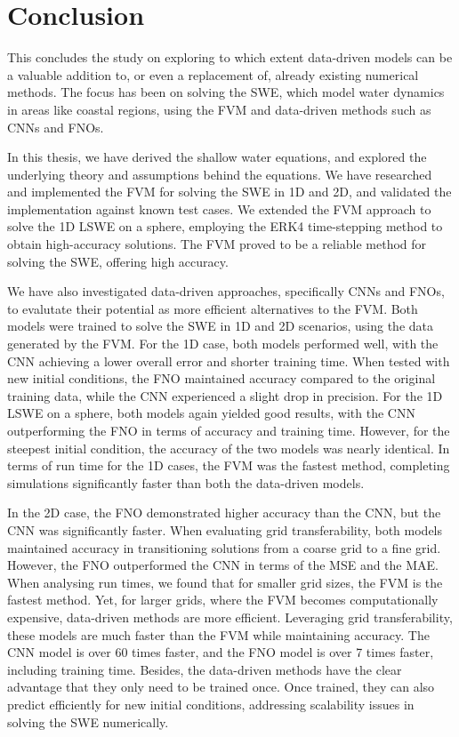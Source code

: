 \chapter{Conclusion}\label{ch:conclusion}
This concludes the study on exploring to which extent data-driven models can be a valuable addition to, or even a replacement of, already existing numerical methods.
The focus has been on solving the SWE, which model water dynamics in areas like coastal regions, using the FVM and data-driven methods such as CNNs and FNOs.

In this thesis, we have derived the shallow water equations, and explored the underlying theory and assumptions behind the equations.
We have researched and implemented the FVM for solving the SWE in 1D and 2D, and validated the implementation against known test cases.
We extended the FVM approach to solve the 1D LSWE on a sphere, employing the ERK4 time-stepping method to obtain high-accuracy solutions.
The FVM proved to be a reliable method for solving the SWE, offering high accuracy.

We have also investigated data-driven approaches, specifically CNNs and FNOs, to evalutate their potential as more efficient alternatives to the FVM.
Both models were trained to solve the SWE in 1D and 2D scenarios, using the data generated by the FVM.
For the 1D case, both models performed well, with the CNN achieving a lower overall error and shorter training time.
When tested with new initial conditions, the FNO maintained accuracy compared to the original training data, while the CNN experienced a slight drop in precision.
For the 1D LSWE on a sphere, both models again yielded good results, with the CNN outperforming the FNO in terms of accuracy and training time.
However, for the steepest initial condition, the accuracy of the two models was nearly identical.
In terms of run time for the 1D cases, the FVM was the fastest method, completing simulations significantly faster than both the data-driven models.

In the 2D case, the FNO demonstrated higher accuracy than the CNN, but the CNN was significantly faster.
When evaluating grid transferability, both models maintained accuracy in transitioning solutions from a coarse grid to a fine grid.
However, the FNO outperformed the CNN in terms of the MSE and the MAE.
When analysing run times, we found that for smaller grid sizes, the FVM is the fastest method.
Yet, for larger grids, where the FVM becomes computationally expensive, data-driven methods are more efficient.
Leveraging grid transferability, these models are much faster than the FVM while maintaining accuracy.
The CNN model is over 60 times faster, and the FNO model is over 7 times faster, including training time.
Besides, the data-driven methods have the clear advantage that they only need to be trained once.
Once trained, they can also predict efficiently for new initial conditions, addressing scalability issues in solving the SWE numerically.

